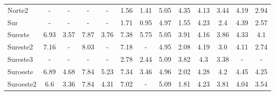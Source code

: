 \begin{table}[H]
\begin{tabular}{lcccccccccccc}
    Norte2                                                                   & -          & -           & -          & -           & 1.56       & 1.41        & 5.05       & 4.35        & 4.13       & 3.44        & 4.19       & 2.94        \\
    Sur                                                                      & -          & -           & -          & -           & 1.71       & 0.95        & 4.97       & 1.55        & 4.23       & 2.4         & 4.39       & 2.57        \\
    Sureste                                                                  & 6.93       & 3.57        & 7.87       & 3.76        & 7.38       & 5.75        & 5.05       & 3.91        & 4.16       & 3.86        & 4.33       & 4.1         \\
    Sureste2                                                                 & 7.16       & -           & 8.03       & -           & 7.18       & -           & 4.95       & 2.08        & 4.19       & 3.0         & 4.11       & 2.74        \\
    Sureste3                                                                 & -          & -           & -          & -           & 2.78       & 2.44        & 5.09       & 3.82        & 4.3        & 3.38        & -          & -           \\
    Suroeste                                                                 & 6.89       & 4.68        & 7.84       & 5.23        & 7.34       & 3.46        & 4.96       & 2.02        & 4.28       & 4.2         & 4.45       & 4.25        \\
    Suroeste2                                                                & 6.6        & 3.36        & 7.84       & 4.31        & 7.02       & -           & 5.09       & 1.81        & 4.23       & 3.81        & 4.04       & 3.54        \\
    \hline
    \end{tabular}
    \end{table}